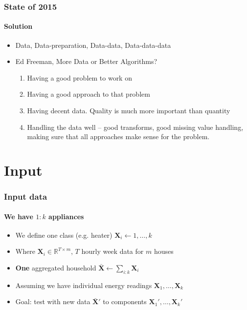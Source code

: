 \documentclass[gray]{beamer}
\begin{document}
\begin{frame}
	\frametitle{State of 2015}
	\framesubtitle{Solution}
	\begin{itemize}
		\item{Data, Data-preparation, Data-data, Data-data-data}
	\end{itemize}
	\begin{itemize}
		\item{Ed Freeman, More Data or Better Algorithms?}
		\begin{enumerate}
			\item{Having a good problem to work on}
			\item{Having a good approach to that problem}
			\item{Having decent data. Quality is much more important than quantity}
			\item{Handling the data well -- good transforms, good missing value handling, making sure that all approaches make sense for the problem.}
		\end{enumerate}
	\end{itemize}
\end{frame}
\section{Input}
\begin{frame}
\frametitle{Input data}
\framesubtitle{We have $1:k$ appliances}
\begin{itemize}
\item{We define one class (e.g. heater) $\mathbf{X}_i \leftarrow 1,\dots, k$}
\item{Where $\mathbf{X}_i \in \mathbb{R}^{T \times m}$, $T$ hourly week data for $m$ houses}
\item{\textbf{One} aggregated household $\bar{\mathbf{X}} \leftarrow \sum_{i:k} \mathbf{X}_i$}
\item{Assuming we have individual energy readings $\mathbf{X}_1,\dots,\mathbf{X}_k$}
\item{Goal: test with new data $\bar{\mathbf{X}}'$ to components $\mathbf{X}_1',\dots,\mathbf{X}_k'$}
\end{itemize}
\end{frame}
\end{document}
